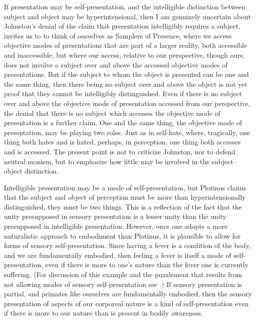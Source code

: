 If presentation may be self-presentation, and the intelligible distinction between subject and object may be hyperintensional, then I am genuinely uncertain about Johnston's denial of the claim that presentation intelligibly requires a subject. \citet{Johnston:2007qy} invites us to to think of ourselves as Samplers of Presence, where we access objective modes of presentations that are part of a larger reality, both accessible and inaccessible, but where our access, relative to our perspective, though ours, does not involve a subject over and above the accessed objective modes of presentations. But if the subject to whom the object is presented can be one and the same thing, then there being no subject over and above the object is not yet proof that they cannot be intelligibly distinguished. Even if there is no subject over and above the objective mode of presentation accessed from our perspective, the denial that there is no subject which accesses the objective mode of presentation is a further claim. One and the same thing, the objective mode of presentation, may be playing two roles. Just as in self-hate, where, tragically, one thing both hates and is hated, perhaps, in perception, one thing both accesses and is accessed. The present point is not to criticize Johnston, nor to defend neutral monism, but to emphasize how little may be involved in the subject--object distinction.

Intelligible presentation may be a mode of self-presentation, but Plotinus claims that the subject and object of perception must be more than hyperintensionally distinguished, they must be two things. This is a reflection of the fact that the unity presupposed in sensory presentation is a lesser unity than the unity presupposed in intelligible presentation. However, once one adopts a more naturalistic approach to embodiment than Plotinus, it is plausible to allow for forms of sensory self-presentation. Since having a fever is a condition of the body, and we are fundamentally embodied, then feeling a fever is itself a mode of self-presentation, even if there is more to one's nature than the fever one is currently suffering. (For discussion of this example and the puzzlement that results from not allowing modes of sensory self-presentation see \citealt{Yrjonsuuri:2008aa}.) If sensory presentation is partial, and primates like ourselves are fundamentally embodied, then the sensory presentation of aspects of our corporeal nature is a kind of self-presentation even if there is more to our nature than is present in bodily awareness. 

